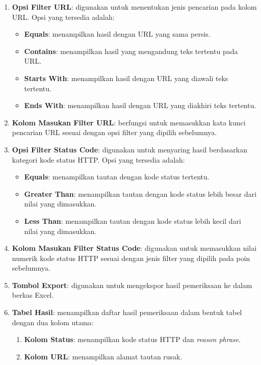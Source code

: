 \begin{enumerate}
\begin{enumerate}
        \item \textbf{Opsi Filter URL}: digunakan untuk menentukan jenis pencarian pada kolom URL. Opsi yang tersedia adalah:
        \begin{itemize}
            \item \textbf{Equals}: menampilkan hasil dengan URL yang sama persis.
            \item \textbf{Contains}: menampilkan hasil yang mengandung teks tertentu pada URL.
            \item \textbf{Starts With}: menampilkan hasil dengan URL yang diawali teks tertentu.
            \item \textbf{Ends With}: menampilkan hasil dengan URL yang diakhiri teks tertentu.
        \end{itemize}
        
        \item \textbf{Kolom Masukan Filter URL}: berfungsi untuk memasukkan kata kunci pencarian URL sesuai dengan opsi filter yang dipilih sebelumnya.
        
        \item \textbf{Opsi Filter Status Code}: digunakan untuk menyaring hasil berdasarkan kategori kode status HTTP. Opsi yang tersedia adalah:
        \begin{itemize}
            \item \textbf{Equals}: menampilkan tautan dengan kode status tertentu.
            \item \textbf{Greater Than}: menampilkan tautan dengan kode status lebih besar dari nilai yang dimasukkan.
            \item \textbf{Less Than}: menampilkan tautan dengan kode status lebih kecil dari nilai yang dimasukkan.
        \end{itemize}
        
        \item \textbf{Kolom Masukan Filter Status Code}: digunakan untuk memasukkan nilai numerik kode status HTTP sesuai dengan jenis filter yang dipilih pada poin sebelumnya.
        
        \item \textbf{Tombol Export}: digunakan untuk mengekspor hasil pemeriksaan ke dalam berkas Excel.
        
        \item \textbf{Tabel Hasil}: menampilkan daftar hasil pemeriksaan dalam bentuk tabel dengan dua kolom utama:
        \begin{enumerate}
            \item \textbf{Kolom Status}: menampilkan kode status HTTP dan \textit{reason phrase}.
            \item \textbf{Kolom URL}: menampilkan alamat tautan rusak.
        \end{enumerate}
        

\end{enumerate}
\end{enumerate}
